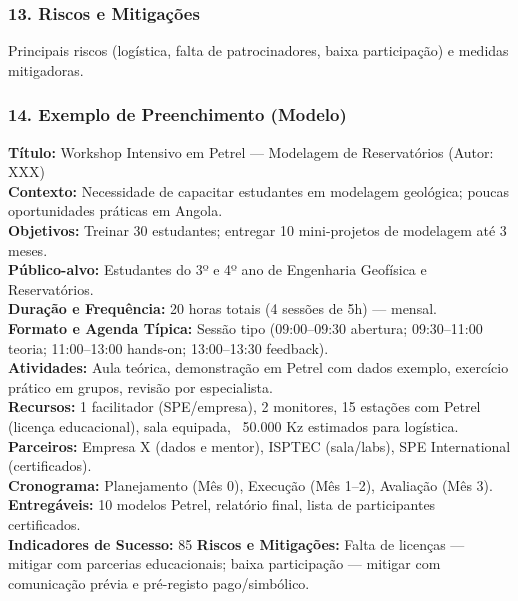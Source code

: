 \documentclass[12pt,a4paper]{article}
\begin{document}
\subsubsection*{13. Riscos e Mitigações}
Principais riscos (logística, falta de patrocinadores, baixa participação) e medidas mitigadoras.

\subsubsection*{14. Exemplo de Preenchimento (Modelo)}
\textbf{Título:} Workshop Intensivo em Petrel — Modelagem de Reservatórios (Autor: XXX) \\
\textbf{Contexto:} Necessidade de capacitar estudantes em modelagem geológica; poucas oportunidades práticas em Angola. \\
\textbf{Objetivos:} Treinar 30 estudantes; entregar 10 mini-projetos de modelagem até 3 meses. \\
\textbf{Público-alvo:} Estudantes do 3º e 4º ano de Engenharia Geofísica e Reservatórios. \\
\textbf{Duração e Frequência:} 20 horas totais (4 sessões de 5h) — mensal. \\
\textbf{Formato e Agenda Típica:} Sessão tipo (09:00–09:30 abertura; 09:30–11:00 teoria; 11:00–13:00 hands-on; 13:00–13:30 feedback). \\
\textbf{Atividades:} Aula teórica, demonstração em Petrel com dados exemplo, exercício prático em grupos, revisão por especialista. \\
\textbf{Recursos:} 1 facilitador (SPE/empresa), 2 monitores, 15 estações com Petrel (licença educacional), sala equipada, ~50.000 Kz estimados para logística. \\
\textbf{Parceiros:} Empresa X (dados e mentor), ISPTEC (sala/labs), SPE International (certificados). \\
\textbf{Cronograma:} Planejamento (Mês 0), Execução (Mês 1–2), Avaliação (Mês 3). \\
\textbf{Entregáveis:} 10 modelos Petrel, relatório final, lista de participantes certificados. \\
\textbf{Indicadores de Sucesso:} 85%
\textbf{Riscos e Mitigações:} Falta de licenças — mitigar com parcerias educacionais; baixa participação — mitigar com comunicação prévia e pré-registo pago/simbólico.

\clearpage
\end{document}
